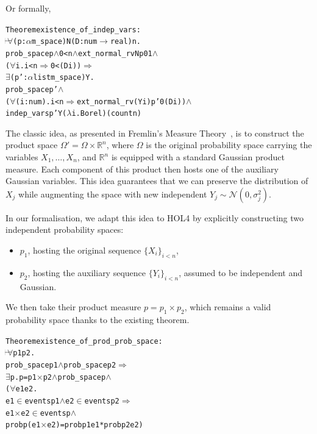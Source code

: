 Or formally,

\begin{hol}
  \begin{alltt}
    Theorem existence\_of\_indep\_vars :
    \(\!\!\!{\turn}\!\!\!\!\) \(\forall\)(p :\(\alpha\) m\_space) N (D :num \(\rightarrow\) real) n.
    prob\_space p \(\land\) 0 < n \(\land\) ext\_normal\_rv N p 0 1 \(\land\)
    (\(\forall\)i. i < n \(\Rightarrow\) 0 < (D i)) \(\Rightarrow\)
    \(\exists\)(p' :\(\alpha\) list m\_space) Y.
    prob\_space p' \(\land\)
    (\(\forall\)(i :num). i < n \(\Rightarrow\) ext\_normal\_rv (Y i) p' 0 (D i)) \(\land\)
    indep\_vars p' Y (\(\lambda\)i. Borel) (count n)
  \end{alltt}
\end{hol}

The classic idea, as presented in Fremlin’s Measure Theory~\cite{fremlinmeasure}, is to construct the product space $\Omega' = \Omega \times \mathbb{R}^n$, where $\Omega$ is the original probability space carrying the variables $X_1, \dots, X_n$, and $\mathbb{R}^n$ is equipped with a standard Gaussian product measure. Each component of this product then hosts one of the auxiliary Gaussian variables. This idea guarantees that we can preserve the distribution of $X_j$ while augmenting the space with new independent $Y_j \sim \mathcal{N}(0, \sigma_j^2)$.

In our formalisation, we adapt this idea to HOL4 by explicitly constructing two independent probability spaces:
\begin{itemize}
    \item $p_1$, hosting the original sequence $\{X_i\}_{i < n}$,
    \item $p_2$, hosting the auxiliary sequence $\{Y_i\}_{i < n}$, assumed to be independent and Gaussian.
\end{itemize}

We then take their product measure $p = p_1 \times p_2$, which remains a valid probability space thanks to the existing  theorem.

\begin{hol}
  \begin{alltt}
    Theorem existence\_of\_prod\_prob\_space :
    \(\!\!\!{\turn}\!\!\!\!\) \(\forall\)p1 p2.
    prob\_space p1 \(\land\) prob\_space p2 \(\Rightarrow\)
    \(\exists\)p. p = p1 \(\times\) p2 \(\land\) prob\_space p \(\land\)
    (\(\forall\)e1 e2.
    e1 \(\in\) events p1 \(\land\) e2 \(\in\) events p2 \(\Rightarrow\)
    e1 \(\times\) e2 \(\in\) events p \(\land\)
    prob p (e1 \(\times\) e2) = prob p1 e1 * prob p2 e2)
  \end{alltt}
\end{hol}

